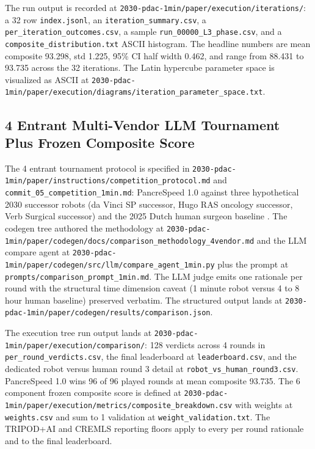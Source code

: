 The run output is recorded at
\texttt{2030-pdac-1min/paper/execution/iterations/}: a 32 row
\texttt{index.jsonl}, an \texttt{iteration_summary.csv}, a
\texttt{per_iteration_outcomes.csv}, a sample
\texttt{run_00000_L3_phase.csv}, and a
\texttt{composite_distribution.txt} ASCII histogram. The headline
numbers are mean composite 93.298, std 1.225, 95\% CI half width
0.462, and range from 88.431 to 93.735 across the 32 iterations.
The Latin hypercube parameter space is visualized as ASCII at
\texttt{2030-pdac-1min/paper/execution/diagrams/iteration_parameter_space.txt}.

\subsection{4 Entrant Multi-Vendor LLM Tournament Plus Frozen Composite Score}
\label{sec:methods-tournament}

The 4 entrant tournament protocol is specified in
\texttt{2030-pdac-1min/paper/instructions/competition_protocol.md}
and \texttt{commit_05_competition_1min.md}: PancreSpeed 1.0
against three hypothetical 2030 successor robots (da Vinci SP
successor, Hugo RAS oncology successor, Verb Surgical successor)
and the 2025 Dutch human surgeon baseline
\cite{DutchCohort2025Whipple}. The codegen tree authored the
methodology at
\texttt{2030-pdac-1min/paper/codegen/docs/comparison_methodology_4vendor.md}
and the LLM compare agent at
\texttt{2030-pdac-1min/paper/codegen/src/llm/compare_agent_1min.py}
plus the prompt at \texttt{prompts/comparison_prompt_1min.md}. The
LLM judge emits one rationale per round with the structural time
dimension caveat (1 minute robot versus 4 to 8 hour human baseline)
preserved verbatim. The structured output lands at
\texttt{2030-pdac-1min/paper/codegen/results/comparison.json}.

The execution tree run output lands at
\texttt{2030-pdac-1min/paper/execution/comparison/}: 128 verdicts
across 4 rounds in \texttt{per_round_verdicts.csv}, the final
leaderboard at \texttt{leaderboard.csv}, and the dedicated robot
versus human round 3 detail at \texttt{robot_vs_human_round3.csv}.
PancreSpeed 1.0 wins 96 of 96 played rounds at mean composite
93.735. The 6 component frozen composite score is defined at
\texttt{2030-pdac-1min/paper/execution/metrics/composite_breakdown.csv}
with weights at \texttt{weights.csv} and sum to 1 validation at
\texttt{weight_validation.txt}. The TRIPOD+AI
\cite{Collins2024TRIPODAI} and CREMLS \cite{ElEmam2024CREMLS}
reporting floors apply to every per round rationale and to the
final leaderboard.

